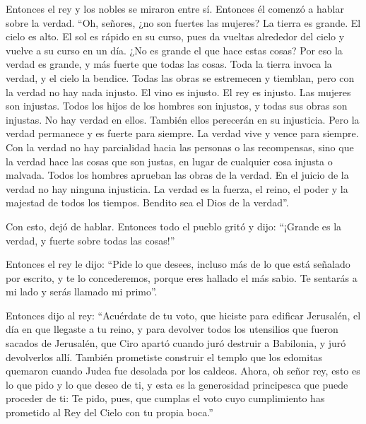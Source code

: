  Entonces el rey y los nobles se miraron entre sí.
Entonces él comenzó a hablar sobre la verdad.  ``Oh,
señores, ¿no son fuertes las mujeres? La tierra es grande. El cielo es
alto. El sol es rápido en su curso, pues da vueltas alrededor del cielo
y vuelve a su curso en un día.  ¿No es grande el que hace
estas cosas? Por eso la verdad es grande, y más fuerte que todas las
cosas.  Toda la tierra invoca la verdad, y el cielo la
bendice. Todas las obras se estremecen y tiemblan, pero con la verdad no
hay nada injusto.  El vino es injusto. El rey es injusto.
Las mujeres son injustas. Todos los hijos de los hombres son injustos, y
todas sus obras son injustas. No hay verdad en ellos. También ellos
perecerán en su injusticia.  Pero la verdad permanece y
es fuerte para siempre. La verdad vive y vence para siempre.
 Con la verdad no hay parcialidad hacia las personas o
las recompensas, sino que la verdad hace las cosas que son justas, en
lugar de cualquier cosa injusta o malvada. Todos los hombres aprueban
las obras de la verdad.  En el juicio de la verdad no hay
ninguna injusticia. La verdad es la fuerza, el reino, el poder y la
majestad de todos los tiempos. Bendito sea el Dios de la verdad''.

 Con esto, dejó de hablar. Entonces todo el pueblo gritó
y dijo: ``¡Grande es la verdad, y fuerte sobre todas las cosas!''

 Entonces el rey le dijo: ``Pide lo que desees, incluso
más de lo que está señalado por escrito, y te lo concederemos, porque
eres hallado el más sabio. Te sentarás a mi lado y serás llamado mi
primo''.

 Entonces dijo al rey: ``Acuérdate de tu voto, que
hiciste para edificar Jerusalén, el día en que llegaste a tu reino,
 y para devolver todos los utensilios que fueron sacados
de Jerusalén, que Ciro apartó cuando juró destruir a Babilonia, y juró
devolverlos allí.  También prometiste construir el templo
que los edomitas quemaron cuando Judea fue desolada por los caldeos.
 Ahora, oh señor rey, esto es lo que pido y lo que deseo
de ti, y esta es la generosidad principesca que puede proceder de ti: Te
pido, pues, que cumplas el voto cuyo cumplimiento has prometido al Rey
del Cielo con tu propia boca.''

